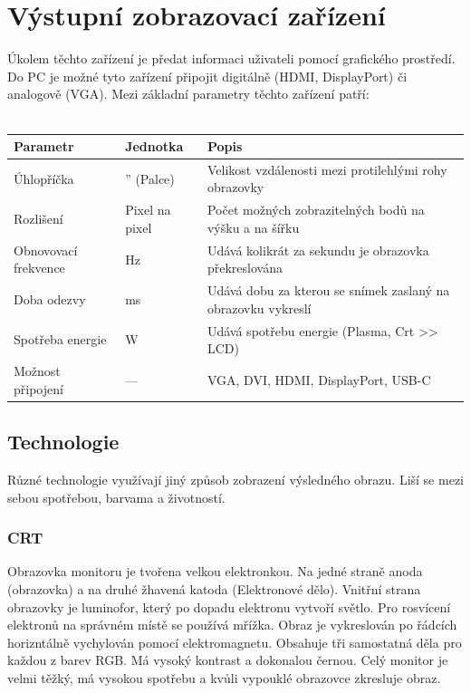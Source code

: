 \section{Výstupní zobrazovací zařízení}
\label{sec:vystupni-zobrazovaci-zarizeni}
Úkolem těchto zařízení je předat informaci uživateli pomocí grafického prostředí.
Do PC je možné tyto zařízení připojit digitálně (HDMI, DisplayPort) či analogově (VGA).
Mezi základní parametry těchto zařízení patří:\\ \\
\begin{tabularx}{\linewidth}{l|l|l}
  \textbf{Parametr}    & \textbf{Jednotka} & \textbf{Popis}                                               \\
  \hline
  Úhlopříčka           & '' (Palce)        & Velikost vzdálenosti mezi protilehlými rohy obrazovky        \\
  \hline
  Rozlišení            & Pixel na pixel    & Počet možných zobrazitelných bodů na výšku a na šířku        \\
  \hline
  Obnovovací frekvence & Hz                & Udává kolikrát za sekundu je obrazovka překreslována         \\
  \hline
  Doba odezvy          & ms                & Udává dobu za kterou se snímek zaslaný na obrazovku vykreslí \\
  \hline
  Spotřeba energie     & W                 & Udává spotřebu energie (Plasma, Crt >> LCD)                  \\
  \hline
  Možnost připojení    & ---               & VGA, DVI, HDMI, DisplayPort, USB-C                           \\
\end{tabularx}
\subsection{Technologie}
Různé technologie využívají jiný způsob zobrazení výsledného obrazu.
Liší se mezi sebou spotřebou, barvama a životností.
\subsubsection{CRT}
Obrazovka monitoru je tvořena velkou elektronkou.
Na jedné straně anoda (obrazovka) a na druhé žhavená katoda (Elektronové dělo).
Vnitřní strana obrazovky je luminofor, který po dopadu elektronu vytvoří světlo.
Pro rosvícení elektronů na správném místě se používá mřížka.
Obraz je vykreslován po řádcích horizntálně vychylován pomocí elektromagnetu.
Obsahuje tři samostatná děla pro každou z barev RGB.
Má vysoký kontrast a dokonalou černou.
Celý monitor je velmi těžký, má vysokou spotřebu a kvůli vypouklé obrazovce zkresluje obraz.
